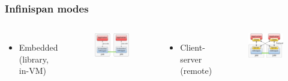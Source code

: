 \documentclass[10pt,utf8]{beamer}
\begin{document}
\begin{frame}
	\frametitle{Infinispan modes}
	\begin{columns}
		\begin{itemize}
			\item Embedded (library, in-VM)
		\end{itemize}
		\begin{figure}
			\includegraphics[width=5cm]{./img/ispn-emb.eps}
		\end{figure}
		\begin{itemize}
			\item Client-server (remote)
		\end{itemize}
		\begin{figure}
			\includegraphics[width=5cm]{./img/ispn-cs.eps}
		\end{figure}
	\end{columns}
\end{frame}
\end{document}
